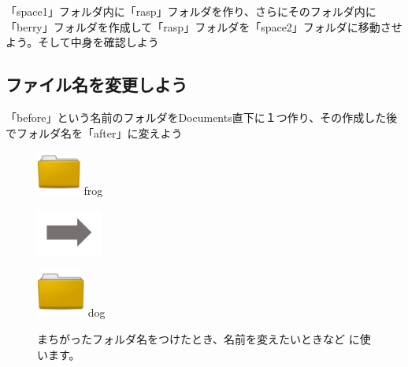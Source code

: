 \documentclass[a4paper,12pt]{jarticle}
\begin{document}
\theQuestion\label{Q:hasAnswer02-2}
「space1」フォルダ内に「rasp」フォルダを作り、さらにそのフォルダ内に「berry」フォルダを作成して「rasp」フォルダを「space2」フォルダに移動させよう。そして中身を確認しよう



\clearpage
{}
\subsection{\theExercise ファイル名を変更しよう}
「before」という名前のフォルダをDocuments直下に１つ作り、その作成した後でフォルダ名を「after」に変えよう

\begin{figure}[ht]

  \centering
  \begin{minipage}{1.978cm}
    \includegraphics[width=1.45cm,height=1.45cm]{textbook-img044.png}
    frog
  \end{minipage}
  \includegraphics[width=2.168cm,height=1.542cm]{textbook-img052.png}
  \begin{minipage}{1.978cm}
    \includegraphics[width=1.588cm,height=1.588cm]{textbook-img044.png}
    dog
  \end{minipage}
  \begin{minipage}{6.319cm}
    まちがったフォルダ名をつけたとき、名前を変えたいときなど
    に使います。
  \end{minipage}


\end{figure}
\end{document}
